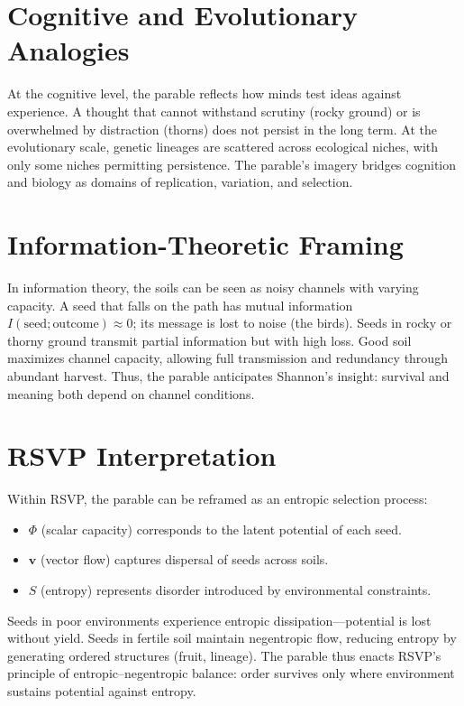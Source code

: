 \documentclass[a4paper,11pt,openany]{book}
\begin{document}
\section{Cognitive and Evolutionary Analogies}
At the cognitive level, the parable reflects how minds test ideas against experience.  
A thought that cannot withstand scrutiny (rocky ground) or is overwhelmed by distraction 
(thorns) does not persist in the long term. At the evolutionary scale, genetic lineages are 
scattered across ecological niches, with only some niches permitting persistence. The 
parable’s imagery bridges cognition and biology as domains of replication, variation, and 
selection.

\section{Information-Theoretic Framing}
In information theory, the soils can be seen as noisy channels with varying capacity.  
A seed that falls on the path has mutual information $I(\text{seed};\text{outcome}) \approx 0$; 
its message is lost to noise (the birds). Seeds in rocky or thorny ground transmit partial 
information but with high loss. Good soil maximizes channel capacity, allowing full 
transmission and redundancy through abundant harvest. Thus, the parable anticipates Shannon’s 
insight: survival and meaning both depend on channel conditions.

\section{RSVP Interpretation}
Within RSVP, the parable can be reframed as an entropic selection process:
\begin{itemize}
  \item $\Phi$ (scalar capacity) corresponds to the latent potential of each seed.  
  \item $\mathbf{v}$ (vector flow) captures dispersal of seeds across soils.  
  \item $S$ (entropy) represents disorder introduced by environmental constraints.  
\end{itemize}
Seeds in poor environments experience entropic dissipation—potential is lost without yield.  
Seeds in fertile soil maintain negentropic flow, reducing entropy by generating ordered 
structures (fruit, lineage). The parable thus enacts RSVP’s principle of entropic–negentropic 
balance: order survives only where environment sustains potential against entropy.
\end{document}
